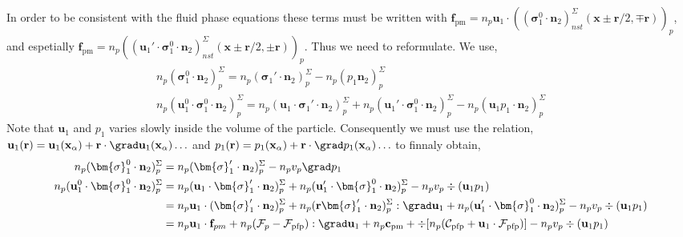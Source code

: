 In order to be consistent with the fluid phase equations these terms must be written with $\textbf{f}_\text{pm} = n_p\textbf{u}_1 \cdot ((\bm{\sigma}_1^0 \cdot  \textbf{n}_2)^\Sigma_{nst}(\textbf{x} \pm \textbf{r}/2,\mp\textbf{r}) )_p$, and espetially  $\textbf{f}_\text{pm} = n_p ((\textbf{u}_1' \cdot\bm{\sigma}_1^0 \cdot  \textbf{n}_2)^\Sigma_{nst}(\textbf{x} \pm \textbf{r}/2,\pm\textbf{r}))_p$. Thus we need to reformulate. 
We use, 
\begin{align*}
    n_p (\bm{\sigma}_1^0 \cdot  \textbf{n}_2)^\Sigma_p
    = 
    n_p ( \bm{\sigma}_1' \cdot  \textbf{n}_2)^\Sigma_p
    - n_p (p_1   \textbf{n}_2)^\Sigma_p\\
    n_p (\textbf{u}_1^0 \cdot \bm{\sigma}_1^0 \cdot  \textbf{n}_2)^\Sigma_p
    = 
    n_p (\textbf{u}_1 \cdot \bm{\sigma}_1' \cdot  \textbf{n}_2)^\Sigma_p
    + n_p (\textbf{u}_1' \cdot \bm{\sigma}_1^0 \cdot  \textbf{n}_2)^\Sigma_p
    - n_p (\textbf{u}_1 p_1 \cdot  \textbf{n}_2)^\Sigma_p
\end{align*}
Note that $\textbf{u}_1$ and $p_1$ varies slowly inside the volume of the particle.
Consequently we must use the relation, $\textbf{u}_1(\textbf{r}) = \textbf{u}_1(\textbf{x}_\alpha) + \textbf{r} \cdot\grad \textbf{u}_1(\textbf{x}_\alpha) \ldots$
and $p_1(\textbf{r}) = p_1(\textbf{x}_\alpha) + \textbf{r} \cdot\grad p_1(\textbf{x}_\alpha) \ldots$
to finnaly obtain, 
\begin{align*}
    n_p (\bm{\sigma}_1^0 \cdot  \textbf{n}_2)^\Sigma_p
    &= 
    n_p ( \bm{\sigma}_1' \cdot  \textbf{n}_2)^\Sigma_p
    - n_p v_p \grad p_1\\
    n_p (\textbf{u}_1^0 \cdot \bm{\sigma}_1^0 \cdot  \textbf{n}_2)^\Sigma_p
    &= 
    n_p (\textbf{u}_1 \cdot \bm{\sigma}_1' \cdot  \textbf{n}_2)^\Sigma_p
    + n_p (\textbf{u}_1' \cdot \bm{\sigma}_1^0 \cdot  \textbf{n}_2)^\Sigma_p
    - n_p v_p \div (\textbf{u}_1 p_1) \\
    &= 
    n_p \textbf{u}_1 \cdot( \bm{\sigma}_1' \cdot  \textbf{n}_2)^\Sigma_p
    + n_p (\textbf{r} \bm{\sigma}_1' \cdot  \textbf{n}_2)^\Sigma_p : \grad \textbf{u}_1
    + n_p (\textbf{u}_1' \cdot \bm{\sigma}_1^0 \cdot  \textbf{n}_2)^\Sigma_p
    - n_p v_p \div (\textbf{u}_1 p_1) \\
    &= 
    n_p \textbf{u}_1 \cdot \textbf{f}_{pm}
    + n_p (\mathcal{F}_p - \mathcal{F}_\text{pfp}): \grad \textbf{u}_1
    + n_p \textbf{c}_\text{pm}
    + \div [n_p(\mathcal{C}_\text{pfp} + \textbf{u}_1 \cdot \mathcal{F}_\text{pfp})]
    - n_p v_p \div (\textbf{u}_1 p_1) 
\end{align*}

